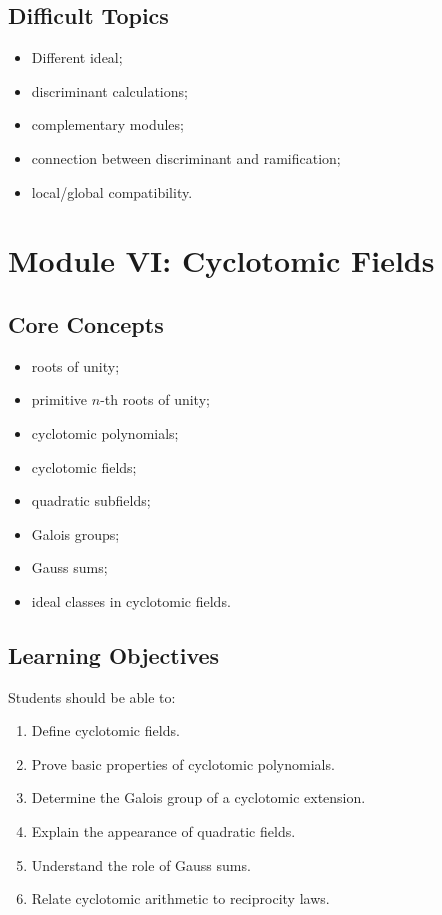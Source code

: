 \documentclass[11pt,a4paper]{article}
\begin{document}
\subsection{Difficult Topics}

\begin{itemize}
    \item Different ideal;
    \item discriminant calculations;
    \item complementary modules;
    \item connection between discriminant and ramification;
    \item local/global compatibility.
\end{itemize}

\section{Module VI: Cyclotomic Fields}

\subsection{Core Concepts}

\begin{itemize}
    \item roots of unity;
    \item primitive \(n\)-th roots of unity;
    \item cyclotomic polynomials;
    \item cyclotomic fields;
    \item quadratic subfields;
    \item Galois groups;
    \item Gauss sums;
    \item ideal classes in cyclotomic fields.
\end{itemize}

\subsection{Learning Objectives}

Students should be able to:

\begin{enumerate}
    \item Define cyclotomic fields.
    \item Prove basic properties of cyclotomic polynomials.
    \item Determine the Galois group of a cyclotomic extension.
    \item Explain the appearance of quadratic fields.
    \item Understand the role of Gauss sums.
    \item Relate cyclotomic arithmetic to reciprocity laws.
\end{enumerate}
\end{document}
